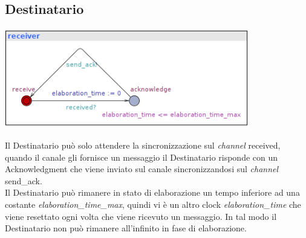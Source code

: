 \documentclass[a4paper]{article}
\newcommand{\channel}{\textit{channel }}
\begin{document}
\subsection{Destinatario}
\begin{center}\includegraphics[width=0.8\textwidth]{1_receiver.png}\end{center}
Il Destinatario può solo attendere la sincronizzazione sul \channel received, quando il canale gli fornisce un messaggio il Destinatario risponde con un Acknowledgment che viene inviato sul canale sincronizzandosi sul \channel send\_ack.\\
Il Destinatario può rimanere in stato di elaborazione un tempo inferiore ad una costante \textit{elaboration\_time\_max}, quindi vi è un altro clock \textit{elaboration\_time} che viene resettato ogni volta che viene ricevuto un messaggio.
In tal modo il Destinatario non può rimanere all'infinito in fase di elaborazione.
\end{document}
